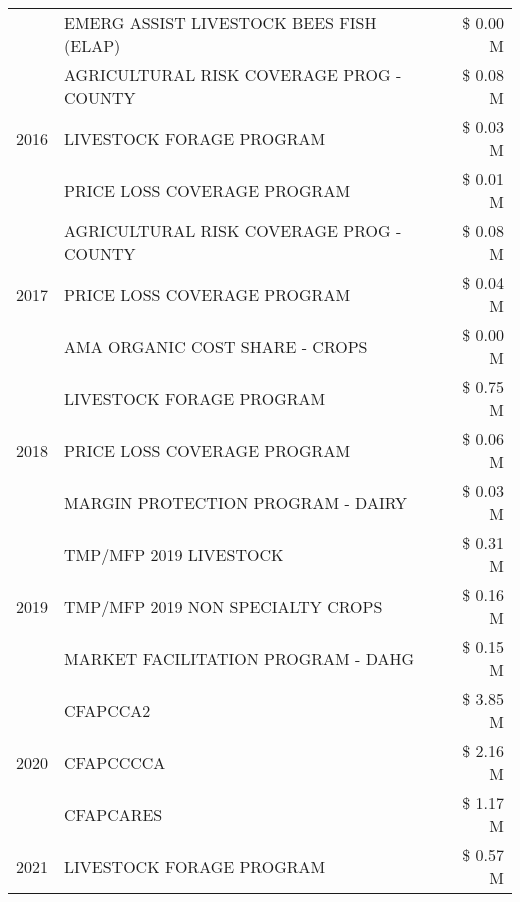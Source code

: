 \begin{tabular}{llr}
 & EMERG ASSIST LIVESTOCK BEES FISH (ELAP) & \$ 0.00 M \\
\cline{1-3}
\multirow[t]{3}{*}{2016} & AGRICULTURAL RISK COVERAGE PROG - COUNTY & \$ 0.08 M \\
 & LIVESTOCK FORAGE PROGRAM & \$ 0.03 M \\
 & PRICE LOSS COVERAGE PROGRAM & \$ 0.01 M \\
\cline{1-3}
\multirow[t]{3}{*}{2017} & AGRICULTURAL RISK COVERAGE PROG - COUNTY & \$ 0.08 M \\
 & PRICE LOSS COVERAGE PROGRAM & \$ 0.04 M \\
 & AMA ORGANIC COST SHARE - CROPS & \$ 0.00 M \\
\cline{1-3}
\multirow[t]{3}{*}{2018} & LIVESTOCK FORAGE PROGRAM & \$ 0.75 M \\
 & PRICE LOSS COVERAGE PROGRAM & \$ 0.06 M \\
 & MARGIN PROTECTION PROGRAM - DAIRY & \$ 0.03 M \\
\cline{1-3}
\multirow[t]{3}{*}{2019} & TMP/MFP 2019 LIVESTOCK & \$ 0.31 M \\
 & TMP/MFP 2019 NON SPECIALTY CROPS & \$ 0.16 M \\
 & MARKET FACILITATION PROGRAM - DAHG & \$ 0.15 M \\
\cline{1-3}
\multirow[t]{3}{*}{2020} & CFAPCCA2 & \$ 3.85 M \\
 & CFAPCCCCA & \$ 2.16 M \\
 & CFAPCARES & \$ 1.17 M \\
\cline{1-3}
2021 & LIVESTOCK FORAGE PROGRAM & \$ 0.57 M \\
\cline{1-3}
\bottomrule
\end{tabular}
